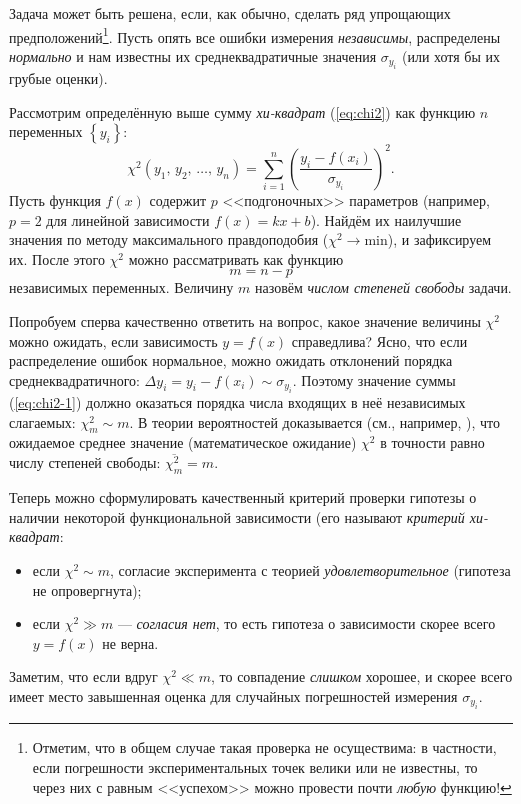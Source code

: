 \documentclass[10pt]{article}
\begin{document}
Задача может быть решена, если, как обычно, сделать ряд упрощающих
предположений\footnote{Отметим, что в общем случае такая проверка не осуществима:
в частности, если погрешности экспериментальных точек велики или не
известны, то через них с равным <<успехом>>
можно провести почти \emph{любую} функцию!}. 
Пусть опять все ошибки измерения \emph{независимы},
распределены \emph{нормально} и нам известны их
среднеквадратичные значения $\sigma_{y_{i}}$ 
(или хотя бы их грубые оценки).

Рассмотрим определённую выше сумму \emph{хи-квадрат} (\ref{eq:chi2}) 
как функцию $n$ переменных $\left\{ y_{i}\right\}$:
\begin{equation}
\chi^{2}\!\left(y_{1},\,y_{2},\,\ldots,\,y_{n}\right)=\sum\limits _{i=1}^{n}\left(\frac{y_{i}-f\!\left(x_{i}\right)}{\sigma_{y_{i}}}\right)^{2}.\label{eq:chi2-1}
\end{equation}
Пусть функция $f\!\left(x\right)$ содержит $p$ <<подгоночных>>
параметров (например, $p=2$ для линейной зависимости $f\!\left(x\right)=kx+b$).
Найдём их наилучшие значения по методу максимального правдоподобия
($\chi^{2}\to\mathrm{min}$), и зафиксируем их. После этого $\chi^{2}$
можно рассматривать как функцию 
\[
m=n-p
\]
независимых переменных. Величину $m$ назовём \emph{числом степеней свободы} задачи.

Попробуем сперва качественно ответить на вопрос, какое значение
величины $\chi^{2}$ можно ожидать, если зависимость $y=f\!\left(x\right)$
справедлива? Ясно, что если распределение ошибок нормальное, можно
ожидать отклонений порядка среднеквадратичного: $\Delta y_{i}=y_{i}-f\!\left(x_{i}\right)\sim\sigma_{y_{i}}$.
Поэтому значение суммы (\ref{eq:chi2-1}) должно оказаться порядка
числа входящих в неё независимых слагаемых: $\chi_{m}^{2}\sim m$.
В теории вероятностей доказывается (см., например, \cite{hudson}), что ожидаемое среднее значение (математическое ожидание) $\chi^{2}$ в точности равно числу степеней свободы: $\overline{\chi_{m}^{2}}=m$.

Теперь можно сформулировать качественный критерий проверки
гипотезы о наличии некоторой функциональной зависимости (его называют
\emph{критерий хи-квадрат}:
\begin{itemize}
\item {\small{}если $\chi^{2}\sim m$, согласие эксперимента с теорией }\emph{\small{}удовлетворительное}{\small{}
(гипотеза не опровергнута); }{\small\par}
\item {\small{}если $\chi^{2}\gg m$ --- }\emph{\small{}согласия
нет}{\small{}, то есть гипотеза о зависимости скорее всего $y=f\!\left(x\right)$
не верна.}{\small\par}
\end{itemize}
Заметим, что если вдруг $\chi^{2}\ll m$, то совпадение \emph{слишком}
хорошее, и скорее всего имеет место завышенная оценка для случайных
погрешностей измерения $\sigma_{y_{i}}$.
\end{document}
